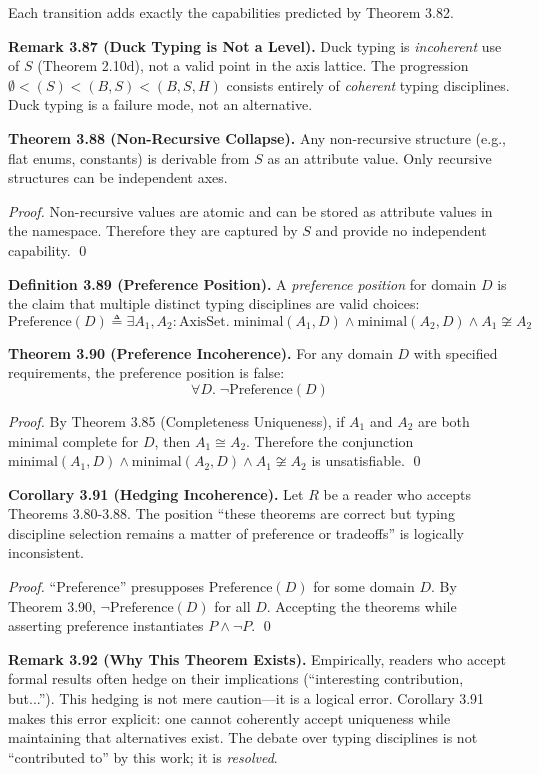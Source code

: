 Each transition adds exactly the capabilities predicted by Theorem 3.82.

\textbf{Remark 3.87 (Duck Typing is Not a Level).} Duck typing is \emph{incoherent} use of $S$ (Theorem 2.10d), not a valid point in the axis lattice. The progression $\emptyset < (S) < (B,S) < (B,S,H)$ consists entirely of \emph{coherent} typing disciplines. Duck typing is a failure mode, not an alternative.

\textbf{Theorem 3.88 (Non-Recursive Collapse).} Any non-recursive structure (e.g., flat enums, constants) is derivable from $S$ as an attribute value. Only recursive structures can be independent axes.

\emph{Proof.} Non-recursive values are atomic and can be stored as attribute values in the namespace. Therefore they are captured by $S$ and provide no independent capability. \qed

\textbf{Definition 3.89 (Preference Position).} A \emph{preference position} for domain $D$ is the claim that multiple distinct typing disciplines are valid choices:
\[\text{Preference}(D) \triangleq \exists A_1, A_2 : \text{AxisSet}.\; \text{minimal}(A_1, D) \land \text{minimal}(A_2, D) \land A_1 \not\cong A_2\]

\textbf{Theorem 3.90 (Preference Incoherence).} For any domain $D$ with specified requirements, the preference position is false:
\[\forall D.\; \neg\text{Preference}(D)\]

\emph{Proof.} By Theorem 3.85 (Completeness Uniqueness), if $A_1$ and $A_2$ are both minimal complete for $D$, then $A_1 \cong A_2$. Therefore the conjunction $\text{minimal}(A_1, D) \land \text{minimal}(A_2, D) \land A_1 \not\cong A_2$ is unsatisfiable. \qed

\textbf{Corollary 3.91 (Hedging Incoherence).} Let $R$ be a reader who accepts Theorems 3.80-3.88. The position ``these theorems are correct but typing discipline selection remains a matter of preference or tradeoffs'' is logically inconsistent.

\emph{Proof.} ``Preference'' presupposes $\text{Preference}(D)$ for some domain $D$. By Theorem 3.90, $\neg\text{Preference}(D)$ for all $D$. Accepting the theorems while asserting preference instantiates $P \land \neg P$. \qed

\textbf{Remark 3.92 (Why This Theorem Exists).} Empirically, readers who accept formal results often hedge on their implications (``interesting contribution, but...'').  This hedging is not mere caution---it is a logical error. Corollary 3.91 makes this error explicit: one cannot coherently accept uniqueness while maintaining that alternatives exist. The debate over typing disciplines is not ``contributed to'' by this work; it is \emph{resolved}.

